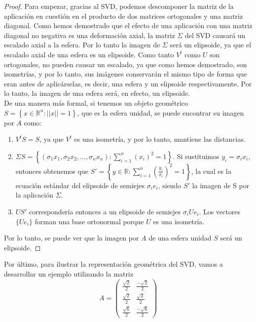 \begin{proof} Para empezar, gracias al SVD, podemos descomponer la matriz de la aplicación en cuestión en el producto de dos matrices ortogonales y una matriz diagonal. Como hemos demostrado que el efecto de una aplicación con una matriz  diagonal no negativa es una deformación axial, la matriz $\Sigma$ del SVD causará un escalado axial a la esfera. Por lo tanto la imagen de $\Sigma$ será un elipsoide, ya que el escalado axial de una esfera es un elipsoide. Como tanto $V^t$ como $U$ son ortogonales, no pueden causar un escalado, ya que como hemos demostrado, son isometrías, y por lo tanto, sus imágenes conservarán el mismo tipo de forma que eran antes de aplicárselas, es decir, una esfera y un elipsoide respectivamente. Por lo tanto, la imagen de una esfera será, en efecto, un elipsoide.\\
	De una manera más formal, si tenemos un objeto geométrico $S=\left\lbrace x\in \mathbb{R}^n:||x||=1 \right\rbrace$, que es la esfera unidad, se puede encontrar su imagen por $A$ como:
	\begin{enumerate}
		\item $V^tS=S$, ya que $V^t$ es una isometría, y por lo tanto, mantiene las distancias.
		\item $\Sigma S=\left\lbrace(\sigma_1x_1,\sigma_2x_2,\dots,\sigma_nx_n):\sum_{i=1}^{n}(x_i)^2=1\right\rbrace$. Si sustituimos $y_i=\sigma_ix_i$, entonces obtenemos que $S'=\left\lbrace y\in\mathbb{R}:\sum_{i=1}^{n}(\frac{y_i}{\sigma_i})^2=1\right\rbrace$, la cual es la ecuación estándar del elipsoide de semiejes $\sigma_i e_i$, siendo $S'$ la imagen de S por la aplicación $\Sigma$.
		\item $US'$ correspondería entonces a un elipsoide de semiejes $\sigma_iUe_i$. Los vectores $\{ Ue_i\}$ forman una base ortonormal porque $U$ es una isometría.
	\end{enumerate}
	Por lo tanto, se puede ver que la imagen por $A$ de una esfera unidad $S$ será un elipsoide.
\end{proof}

Por último, para ilustrar la representación geométrica del SVD, vamos a desarrollar un ejemplo utilizando la matriz
\[
	A =
	\begin{pmatrix}
		\frac{\sqrt2}{2} & \frac{-\sqrt2}{2} \\
		\frac{\sqrt2}{2} & \frac{\sqrt2}{2}  \\
		\frac{\sqrt6}{2} & \frac{-\sqrt6}{2}
	\end{pmatrix}
\]

